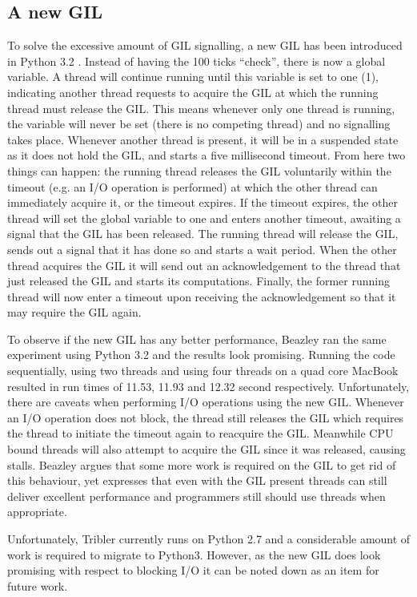 \subsection{A new GIL}

To solve the excessive amount of GIL signalling, a new GIL has been introduced in Python 3.2 \cite{beazley2010understanding}.
Instead of having the 100 ticks \enquote{check}, there is now a global variable.
A thread will continue running until this variable is set to one (1), indicating another thread requests to acquire the GIL at which the running thread must release the GIL.
This means whenever only one thread is running, the variable will never be set (there is no competing thread) and no signalling takes place.
Whenever another thread is present, it will be in a suspended state as it does not hold the GIL, and starts a five millisecond timeout.
From here two things can happen: the running thread releases the GIL voluntarily within the timeout (e.g. an I/O operation is performed) at which the other thread can immediately acquire it, or the timeout expires.
If the timeout expires, the other thread will set the global variable to one and enters another timeout, awaiting a signal that the GIL has been released.
The running thread will release the GIL, sends out a signal that it has done so and starts a wait period.
When the other thread acquires the GIL it will send out an acknowledgement to the thread that just released the GIL and starts its computations.
Finally, the former running thread will now enter a timeout upon receiving the acknowledgement so that it may require the GIL again.

To observe if the new GIL has any better performance, Beazley ran the same experiment using Python 3.2 and the results look promising.
Running the code sequentially, using two threads and using four threads on a quad core MacBook resulted in run times of 11.53, 11.93 and 12.32 second respectively.
Unfortunately, there are caveats when performing I/O operations using the new GIL.
Whenever an I/O operation does not block, the thread still releases the GIL which requires the thread to initiate the timeout again to reacquire the GIL.
Meanwhile CPU bound threads will also attempt to acquire the GIL since it was released, causing stalls.
Beazley argues that some more work is required on the GIL to get rid of this behaviour, yet expresses that even with the GIL present threads can still deliver excellent performance and programmers still should use threads when appropriate.

Unfortunately, Tribler currently runs on Python 2.7 and a considerable amount of work is required to migrate to Python3.
However, as the new GIL does look promising with respect to blocking I/O it can be noted down as an item for future work.

